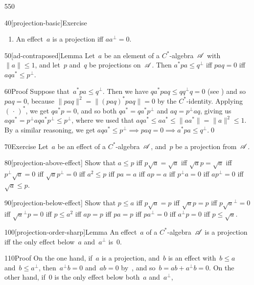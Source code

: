\begin{parsec}{550}
\begin{point}{40}[projection-basic]{Exercise}
\begin{enumerate}
is a projection.
\item
An effect~$a$ is a projection iff $aa^\perp=0$.
\end{enumerate}
\end{point}
\begin{point}{50}[ad-contraposed]{Lemma}%
Let~$a$ be an element of a $C^*$-algebra~$\mathscr{A}$
with $\|a\|\leq 1$,
and let~$p$ and~$q$ be projections on~$\mathscr{A}$.
Then 
$a^* p a \leq q^\perp$
iff $paq=0$
iff  $aqa^*\leq p^\perp$.
\begin{point}{60}{Proof}%
Suppose that~$a^*pa\leq q^\perp$.
Then we have $q a^*pa q \leq qq^\perp q = 0$
(see )
and so $paq=0$,
because $\|paq\|^2=\|(paq)^*paq\|=0$
by the $C^*$-identity.
Applying $(\,\cdot\,)^*$,
we get $qa^*p=0$, and so both $qa^* = qa^*p^\perp$
and $aq = p^\perp aq$, giving
us $aqa^* = p^\perp a q a^* p^\perp 
\leq p^\perp$,
where we used that $aqa^*\leq aa^*\leq \|aa^*\|=\|a\|^2\leq 1$.
By a similar reasoning,
we get $aqa^*\leq p^\perp \implies paq=0\implies a^*pa\leq q^\perp$.\qed
\end{point}
\end{point}
\begin{point}{70}{Exercise}%
Let~$a$ be an effect of a $C^*$-algebra~$\mathscr{A}$,
and~$p$ be a projection from~$\mathscr{A}$.
\begin{point}{80}[projection-above-effect]%
Show that $a\leq p$
iff $p\sqrt{a} = \sqrt{a}$
iff $\sqrt{a}p = \sqrt{a}$
iff $p^\perp\sqrt{a} = 0$
iff $\sqrt{a}p^\perp = 0$
iff $a^2\leq p$
iff $p a  = a$
iff $ a p = a $
iff $p^\perp a  = 0$
iff $ap^\perp = 0$
iff $\sqrt{a}\leq p$.
\end{point}
\begin{point}{90}[projection-below-effect]%
Show that $p\leq a$
iff $p \sqrt{a} = p$
iff $\sqrt{a} p = p$
iff $ p\sqrt{a}^\perp = 0$
iff $\sqrt{a}^\perp p = 0$
iff $p\leq a^2$
iff $ap=p$
iff $pa = p$
iff $pa^\perp =0$
iff $a^\perp p =0$
iff $p\leq \sqrt{a}$.
\end{point}
\end{point}
\begin{point}{100}[projection-order-sharp]{Lemma}%
An effect~$a$ of a $C^*$-algebra~$\mathscr{A}$
is a projection iff the only effect
below~$a$ and~$a^\perp$ is~$0$.
\begin{point}{110}{Proof}%
On the one hand,
if~$a$ is a projection,
and~$b$ is an effect with~$b\leq a$
and~$b\leq a^\perp$,
then~$a^\perp b=0$ and~$ab=0$ by~,
and so~$b=ab+a^\perp b = 0$.
On the other hand,
if~$0$ is the only effect below both~$a$ and~$a^\perp$,

\end{point}
\end{point}
\end{parsec}
